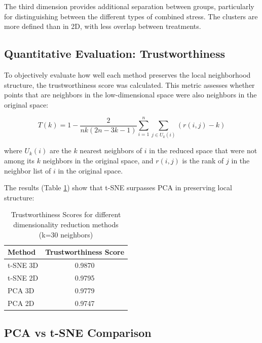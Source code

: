 \documentclass[12pt,a4paper]{article}
\begin{document}
The third dimension provides additional separation between groups, particularly for distinguishing between the different types of combined stress. The clusters are more defined than in 2D, with less overlap between treatments.

\subsection{Quantitative Evaluation: Trustworthiness}

To objectively evaluate how well each method preserves the local neighborhood structure, the trustworthiness score was calculated. This metric assesses whether points that are neighbors in the low-dimensional space were also neighbors in the original space:

\begin{equation}
T(k) = 1 - \frac{2}{nk(2n-3k-1)} \sum_{i=1}^{n} \sum_{j \in U_k(i)} (r(i,j) - k)
\end{equation}

where $U_k(i)$ are the $k$ nearest neighbors of $i$ in the reduced space that were not among its $k$ neighbors in the original space, and $r(i,j)$ is the rank of $j$ in the neighbor list of $i$ in the original space.

The results (Table \ref{tab:trustworthiness}) show that t-SNE surpasses PCA in preserving local structure:

\begin{table}[H]
\centering
\caption{Trustworthiness Scores for different dimensionality reduction methods (k=30 neighbors)}
\label{tab:trustworthiness}
\begin{tabular}{lc}
\toprule
\textbf{Method} & \textbf{Trustworthiness Score} \\
\midrule
t-SNE 3D & 0.9870 \\
t-SNE 2D & 0.9795 \\
PCA 3D & 0.9779 \\
PCA 2D & 0.9747 \\
\bottomrule
\end{tabular}
\end{table}

\subsection{PCA vs t-SNE Comparison}
\end{document}
